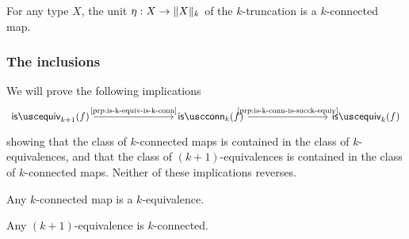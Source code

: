 \begin{cor}
  For any type $X$, the unit $\eta:X\to\trunc{k}{X}$ of the $k$-truncation is a $k$-connected map. 
\end{cor}

\subsubsection{The inclusions}

We will prove the following implications
\begin{equation*}
  \begin{tikzcd}[column sep=8em]
    \isequiv_{k+1}(f) \arrow[r,"\text{\cref{prp:is-k-equiv-is-k-conn}}"] & \isconn_k(f) \arrow[r,"\text{\cref{prp:is-k-conn-is-succk-equiv}}"] & \isequiv_k(f)
  \end{tikzcd}
\end{equation*}
showing that the class of $k$-connected maps is contained in the class of $k$-equivalences, and that the class of $(k+1)$-equivalences is contained in the class of $k$-connected maps. Neither of these implications reverses.

\begin{prp}\label{prp:is-k-equiv-is-k-conn}
  Any $k$-connected map is a $k$-equivalence.
\end{prp}

\begin{prp}\label{prp:is-k-conn-is-succk-equiv}
  Any $(k+1)$-equivalence is $k$-connected.
\end{prp}


